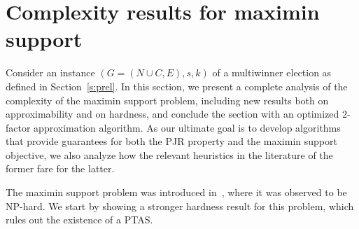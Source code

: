 \section{Complexity results for maximin support}\label{s:complexity}

Consider an instance $(G=(N\cup C, E), s, k)$ of a multiwinner election as defined in Section~\ref{s:prel}. 
In this section, we present a complete analysis of the complexity of the maximin support problem, including new results both on approximability and on hardness, and conclude the section with an optimized $2$-factor approximation algorithm. As our ultimate goal is to develop algorithms that provide guarantees for both the PJR property and the maximin support objective, we also analyze how the relevant heuristics in the literature of the former fare for the latter. 

The maximin support problem was introduced in~\cite{sanchez2016maximin}, where it was observed to be NP-hard. We start by showing a stronger hardness result for this problem, which rules out the existence of a PTAS.

